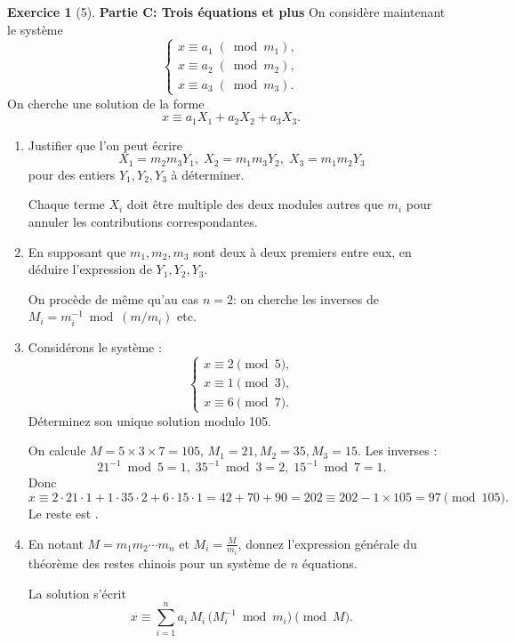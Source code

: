 \documentclass{article}
\theoremstyle{definition}
\newtheorem{exercice}{Exercice}
\begin{document}
\begin{exercice}[5]
\textbf{Partie C: Trois équations et plus}
On considère maintenant le système
\[\begin{cases}x\equiv a_1\; (\bmod m_1),\\x\equiv a_2\; (\bmod m_2),\\x\equiv a_3\; (\bmod m_3).
\end{cases}\]
On cherche une solution de la forme
\[x\equiv a_1X_1+a_2X_2+a_3X_3.\]
\begin{enumerate}
 \item Justifier que l'on peut écrire
 \[X_1=m_2m_3Y_1,\;X_2=m_1m_3Y_2,\;X_3=m_1m_2Y_3\]
pour des entiers $Y_1,Y_2,Y_3$ à déterminer.

 Chaque terme $X_i$ doit être multiple des deux modules autres que $m_i$ pour annuler les contributions correspondantes.

 \item En supposant que $m_1,m_2,m_3$ sont deux à deux premiers entre eux, en déduire l'expression de $Y_1,Y_2,Y_3$.

 On procède de même qu'au cas $n=2$: on cherche les inverses de $M_i=m_i^{-1}\bmod(m/m_i)$ etc.

 \item Considérons le système :
 \[\begin{cases}x\equiv2\pmod5,\\x\equiv1\pmod3,\\x\equiv6\pmod7.
 \end{cases}\]
 Déterminez son unique solution modulo 105.

 On calcule $M=5\times3\times7=105$, $M_1=21,M_2=35,M_3=15$. Les inverses :
 \[21^{-1}\bmod5=1,\;35^{-1}\bmod3=2,\;15^{-1}\bmod7=1.\]
 Donc
 \[x\equiv2\cdot21\cdot1+1\cdot35\cdot2+6\cdot15\cdot1=42+70+90=202\equiv202-1\times105=97\pmod{105}.\]
 Le reste est .

 \item[(Bonus)] En notant $M=m_1m_2\cdots m_n$ et $M_i=\tfrac{M}{m_i}$, donnez l'expression générale du 
 théorème des restes chinois pour un système de $n$ équations.

 La solution s'écrit
 \[x\equiv\sum_{i=1}^n a_i\,M_i\,\bigl(M_i^{-1}\bmod m_i\bigr)\pmod{M}.\]
\end{enumerate}
\end{exercice}
\end{document}
